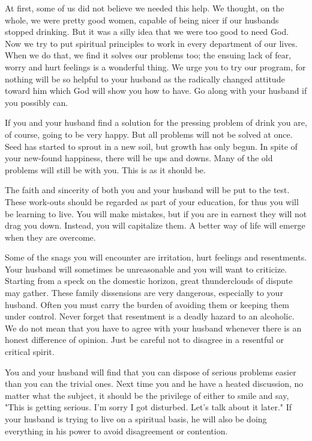 \begin{biblechapter}
At first, some of us did not believe we needed this help.  We thought, on the whole, we were pretty good women, capable of being nicer if our husbands stopped drinking.  But it was a silly idea that we were too good to need God.  Now we try to put spiritual principles to work in every department of our lives.  When we do that, we find it solves our problems too; the ensuing lack of fear, worry and hurt feelings is a wonderful thing.  We urge you to try our program, for nothing will be so helpful to your husband as the radically changed attitude toward him which God will show you how to have.  Go along with your husband if you possibly can.

If you and your husband find a solution for the pressing problem of drink you are, of course, going to be very happy.  But all problems will not be solved at once.  Seed has started to sprout in a new soil, but growth has only begun.  In spite of your new-found happiness, there will be ups and downs.  Many of the old problems will still be with you.  This is as it should be.  

The faith and sincerity of both you and your husband will be put to the test.  These work-outs should be regarded as part of your education, for thus you will be learning to live.  You will make mistakes, but if you are in earnest they will not drag you down.  Instead, you will capitalize them.  A better way of life will emerge when they are overcome.

Some of the snags you will encounter are irritation, hurt feelings and resentments.  Your husband will sometimes be unreasonable and you will want to criticize.  Starting from a speck on the domestic horizon, great thunderclouds of dispute may gather.  These family dissensions are very dangerous, especially to your husband.  Often you must carry the burden of avoiding them or keeping them under control.  Never forget that resentment is a deadly hazard to an alcoholic.  We do not mean that you have to agree with your husband whenever there is an honest difference of opinion.  Just be careful not to disagree in a resentful or critical spirit.

You and your husband will find that you can dispose of serious problems easier than you can the trivial ones.  Next time you and he have a heated discussion, no matter what the subject, it should be the privilege of either to smile and say, "This is getting serious.  I'm sorry I got disturbed.  Let's talk about it later."  If your husband is trying to live on a spiritual basis, he will also be doing everything in his power to avoid disagreement or contention.


\end{biblechapter}
